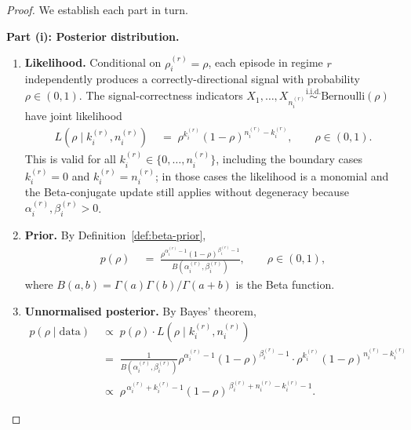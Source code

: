 \documentclass[12pt,openany]{book}
\numberwithin{equation}{chapter}
\theoremstyle{plain}
\theoremstyle{definition}
\theoremstyle{remark}
\numberwithin{equation}{chapter}
\theoremstyle{plain}
\begin{document}
\begin{proof}
We establish each part in turn.

\medskip
\noindent\textbf{Part (i): Posterior distribution.}

\begin{enumerate}
  \item[\textup{(a)}] \textbf{Likelihood.}
        Conditional on $\rho_i^{(r)} = \rho$, each episode
        in regime $r$ independently produces a correctly-directional
        signal with probability $\rho \in (0,1)$.  The
        signal-correctness indicators
        $X_1, \ldots, X_{n_i^{(r)}} \overset{\mathrm{i.i.d.}}{\sim}
        \mathrm{Bernoulli}(\rho)$ have joint likelihood
        \begin{align}
          L\!\left(\rho \mid k_i^{(r)}, n_i^{(r)}\right)
          &\;=\;
          \rho^{k_i^{(r)}} (1-\rho)^{n_i^{(r)} - k_i^{(r)}},
          \qquad \rho \in (0,1).
          \label{eq:likelihood}
        \end{align}
        This is valid for all
        $k_i^{(r)} \in \{0,\ldots, n_i^{(r)}\}$, including
        the boundary cases $k_i^{(r)} = 0$ and
        $k_i^{(r)} = n_i^{(r)}$; in those cases the likelihood
        is a monomial and the Beta-conjugate update still applies
        without degeneracy because $\alpha_i^{(r)}, \beta_i^{(r)} > 0$.

  \item[\textup{(b)}] \textbf{Prior.}
        By Definition~\ref{def:beta-prior},
        \begin{align}
          p(\rho)
          &\;=\;
          \frac{\rho^{\alpha_i^{(r)}-1}
                (1-\rho)^{\beta_i^{(r)}-1}}
               {B\!\left(\alpha_i^{(r)},\beta_i^{(r)}\right)},
          \qquad \rho \in (0,1),
          \label{eq:prior-density}
        \end{align}
        where $B(a,b) = \Gamma(a)\Gamma(b)/\Gamma(a+b)$ is the
        Beta function.

  \item[\textup{(c)}] \textbf{Unnormalised posterior.}
        By Bayes' theorem,
        \begin{align}
          p\!\left(\rho \mid \mathrm{data}\right)
          &\;\propto\;
          p(\rho)\cdot
          L\!\left(\rho \mid k_i^{(r)}, n_i^{(r)}\right)
          \nonumber\\[4pt]
          &\;=\;
          \frac{1}{B\!\left(\alpha_i^{(r)},\beta_i^{(r)}\right)}
          \rho^{\alpha_i^{(r)}-1}(1-\rho)^{\beta_i^{(r)}-1}
          \cdot
          \rho^{k_i^{(r)}}(1-\rho)^{n_i^{(r)}-k_i^{(r)}}
          \nonumber\\[4pt]
          &\;\propto\;
          \rho^{\,\alpha_i^{(r)} + k_i^{(r)} - 1}
          (1-\rho)^{\,\beta_i^{(r)} + n_i^{(r)} - k_i^{(r)} - 1}.
          \label{eq:unnorm-posterior}
        \end{align}


\end{enumerate}
\end{proof}
\end{document}
